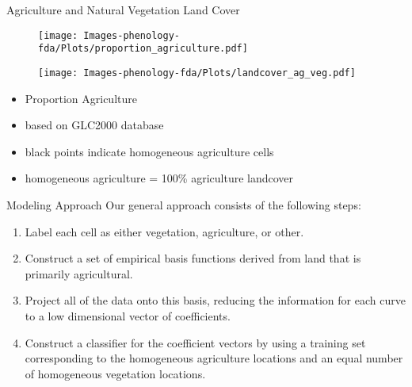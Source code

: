 \documentclass{beamer}
\begin{document}
\begin{frame}[t]{Agriculture and Natural Vegetation Land Cover}
	\begin{minipage}{0.48\textwidth}
		\begin{figure}
		\texttt{[image: Images-phenology-fda/Plots/proportion\_agriculture.pdf]}
		\end{figure}
	\end{minipage}
	\begin{minipage}{0.48\textwidth}
		\begin{figure}
		\texttt{[image: Images-phenology-fda/Plots/landcover\_ag\_veg.pdf]}
		\end{figure}
	\end{minipage}
	
	\begin{minipage}{0.48\textwidth}
	\begin{itemize}
		\item Proportion Agriculture
		\item based on GLC2000 database
	\end{itemize}
	\end{minipage}
	\begin{minipage}{0.48\textwidth}
	\begin{itemize}
		\item black points indicate homogeneous agriculture cells
		\item homogeneous agriculture = 100\% agriculture landcover
	\end{itemize}
	\end{minipage}
\end{frame}

\begin{frame}[t]{Modeling Approach}
	 Our general approach consists of the following steps:
	\begin{enumerate}
		\item Label each cell as either vegetation, agriculture, or other. 
		\item Construct a set of empirical basis functions derived from land that is primarily agricultural. 
		\item Project all of the data onto this basis, reducing the information for each curve to a low dimensional vector of coefficients.
		\item Construct a classifier for the coefficient vectors by using a training set corresponding to the homogeneous agriculture locations and an equal number of homogeneous vegetation locations.  
	\end{enumerate}
\end{frame}
\end{document}
